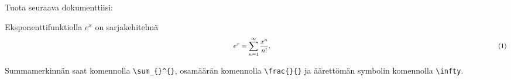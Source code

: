     \begin{harj}\label{viittausTehtava}
        Tuota seuraava dokumenttiisi:
        \begin{sample}
            Eksponenttifunktiolla \(e^x\) on sarjakehitelmä
            \begin{equation*}
                \hskip\textwidth minus \textwidth e^x=\sum_{n=1}^\infty\frac{x^n}{n!}.\hskip\textwidth minus \textwidth (1)
            \end{equation*}
        \end{sample}
        Summamerkinnän saat komennolla \verb-\sum_{}^{}-, osamäärän komennolla \verb-\frac{}{}- ja äärettömän symbolin komennolla \verb-\infty-. 
    \end{harj}
